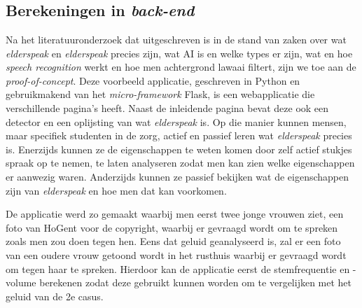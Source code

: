 
\chapter{}
\label{ch:methodologie}


\section{Berekeningen in \textit{back-end}}
Na het literatuuronderzoek dat uitgeschreven is in de stand van zaken over wat \textit{elderspeak} en \textit{elderspeak} precies zijn, wat AI is en welke types er zijn, wat en hoe \textit{speech recognition} werkt en hoe men achtergrond lawaai filtert, zijn we toe aan de \textit{proof-of-concept}. Deze voorbeeld applicatie, geschreven in Python en gebruikmakend van het \textit{micro-framework} Flask, is een webapplicatie die verschillende pagina’s heeft. Naast de inleidende pagina bevat deze ook een detector en een oplijsting van wat \textit{elderspeak} is. Op die manier kunnen mensen, maar specifiek studenten in de zorg, actief en passief leren wat \textit{elderspeak} precies is. Enerzijds kunnen ze de eigenschappen te weten komen door zelf actief stukjes spraak op te nemen, te laten analyseren zodat men kan zien welke eigenschappen er aanwezig waren. Anderzijds kunnen ze passief bekijken wat de eigenschappen zijn van \textit{elderspeak} en hoe men dat kan voorkomen.

De applicatie werd zo gemaakt waarbij men eerst twee jonge vrouwen ziet, een foto van HoGent voor de copyright, waarbij er gevraagd wordt om te spreken zoals men zou doen tegen hen. Eens dat geluid geanalyseerd is, zal er een foto van een oudere vrouw getoond wordt in het rusthuis waarbij er gevraagd wordt om tegen haar te spreken. Hierdoor kan de applicatie eerst de stemfrequentie en -volume berekenen zodat deze gebruikt kunnen worden om te vergelijken met het geluid van de 2e casus.

